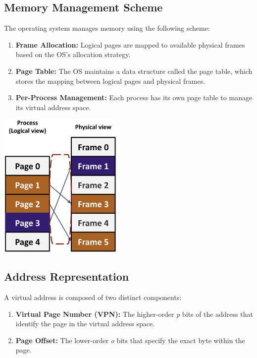 \subsection{Memory Management Scheme}
The operating system manages memory using the following scheme:\\[5px]
\noindent
\begin{minipage}{0.45\textwidth}
\begin{enumerate}
  \item \textbf{Frame Allocation:} Logical pages are mapped to available physical frames based on the OS's allocation strategy.
  \item \textbf{Page Table:} The OS maintains a data structure called the page table, which stores the mapping between logical pages and physical frames.
  \item \textbf{Per-Process Management:} Each process has its own page table to manage its virtual address space.
\end{enumerate}
\end{minipage}%
\hfill
\vline
\hfill
\begin{minipage}{0.45\textwidth}
  \begin{center}
    \includegraphics[width=0.45\textwidth]{chapters/L5/images/mapping.png}
  \end{center}
\end{minipage}

\subsection{Address Representation}
A virtual address is composed of two distinct components:
\begin{enumerate}
  \item \textbf{Virtual Page Number (VPN):} The higher-order \textit{p} bits of the address that identify the page in the virtual address space.
  \item \textbf{Page Offset:} The lower-order \textit{o} bits that specify the exact byte within the page.
\end{enumerate}

